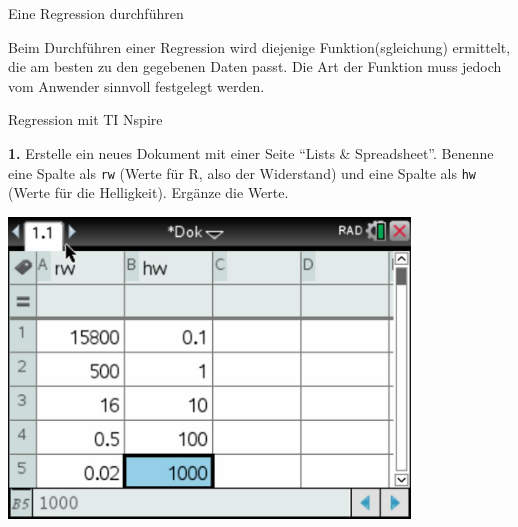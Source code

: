 
\newpage
\begin{zsfg}{Eine Regression durchführen}
	
	Beim Durchführen einer Regression wird diejenige Funktion(sgleichung) ermittelt, die am besten zu den gegebenen Daten passt. Die Art der Funktion muss jedoch vom Anwender sinnvoll festgelegt werden.
\end{zsfg}	
\begin{zsfg}{Regression mit TI Nspire}
	
	\smallskip
	\begin{minipage}[c][4.5cm][t]{0.48\textwidth}
		\textbf{1.} Erstelle ein neues Dokument mit einer Seite \enquote{Lists \& Spreadsheet}. Benenne eine Spalte als \texttt{rw} (Werte für R, also der Widerstand) und eine Spalte als \texttt{hw} (Werte für die Helligkeit). Ergänze die Werte.
	\end{minipage}
	\hfill
	\begin{minipage}[c][4.5cm][t]{0.48\textwidth}
		\centering
		\includegraphics[width=0.8\textwidth]{./pics/RegressionLDR-TI-1.jpg}
	\end{minipage}
	

\end{zsfg}
